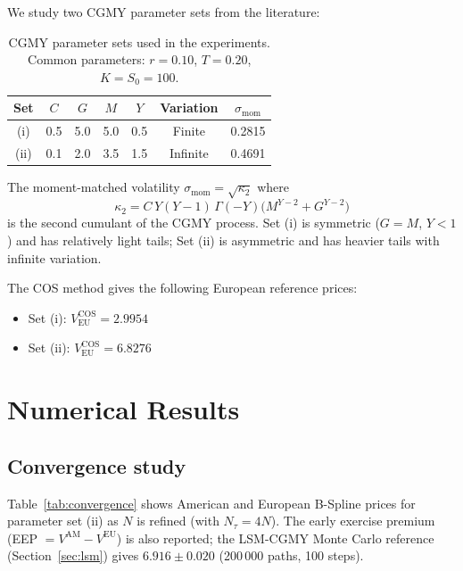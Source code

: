 \documentclass[11pt,a4paper]{article}
\begin{document}
We study two CGMY parameter sets from the literature:

\begin{table}[ht]
\centering
\caption{CGMY parameter sets used in the experiments.
  Common parameters: $r=0.10$, $T=0.20$, $K=S_0=100$.}
\label{tab:params}
\begin{tabular}{ccccccc}
\toprule
Set & $C$ & $G$ & $M$ & $Y$ & Variation & $\sigma_{\mathrm{mom}}$ \\
\midrule
(i)  & 0.5 & 5.0 & 5.0 & 0.5 & Finite   & 0.2815 \\
(ii) & 0.1 & 2.0 & 3.5 & 1.5 & Infinite & 0.4691 \\
\bottomrule
\end{tabular}
\end{table}

The moment-matched volatility $\sigma_{\mathrm{mom}}=\sqrt{\kappa_2}$ where
\begin{equation}
  \kappa_2 = C\,Y(Y-1)\,\Gamma(-Y)\bigl(M^{Y-2}+G^{Y-2}\bigr)
\end{equation}
is the second cumulant of the CGMY process.  Set (i) is symmetric
($G=M$, $Y<1$) and has relatively light tails; Set (ii) is asymmetric and
has heavier tails with infinite variation.

The COS method \cite{Fang2008} gives the following European reference prices:
\begin{itemize}
  \item Set (i): $V_{\mathrm{EU}}^{\mathrm{COS}} = 2.9954$
  \item Set (ii): $V_{\mathrm{EU}}^{\mathrm{COS}} = 6.8276$
\end{itemize}

\section{Numerical Results}

\subsection{Convergence study}

Table~\ref{tab:convergence} shows American and European B-Spline prices for
parameter set (ii) as $N$ is refined (with $N_\tau = 4N$).  The early exercise
premium (EEP $= V^{\mathrm{AM}} - V^{\mathrm{EU}}$) is also reported; the
LSM-CGMY Monte Carlo reference (Section~\ref{sec:lsm}) gives
$6.916\pm 0.020$ (200\,000 paths, 100 steps).
\end{document}
